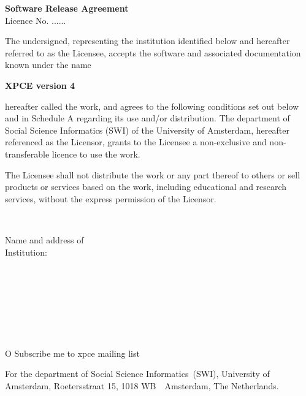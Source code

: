 \setlength{\parindent}{0in}
\setlength{\parskip}{5pt}
\nofiles

\begin{center}
    { \Large \bf Software Release Agreement } \\
    \vspace{1cm}
    { Licence No. ...... }
    \vspace{1.5cm}
\end{center}

The undersigned, representing the institution identified below and
hereafter referred to as the Licensee, accepts the software and
associated documentation known under the name

\vspace{5mm}
\centerline{\Large \bf XPCE version 4}
\vspace{5mm}

hereafter called the work, and agrees to the following conditions set
out below and in Schedule A regarding its use and/or distribution. The
department of Social Science Informatics (SWI) of the University of
Amsterdam, hereafter referenced as the Licensor, grants to the Licensee
a non-exclusive and non-transferable licence to use the work.

The Licensee shall not distribute the work or any part thereof to others
or sell products or services based on the work, including educational
and research services, without the express permission of the Licensor.

\newlength{\tag}
\settowidth{\tag}{Authorised Signature: }
\newlength{\rest}
\setlength{\rest}{\textwidth}
\addtolength{\rest}{-\tag}

\newcommand{\fillin}{\dotfill\mbox{}}
\newcommand{\onlydots}{\mbox{}\fillin}
\newcommand{\next}{\\[5mm]}

\vspace{0.5cm}
\fillin \next
\parbox[t]{\tag}{Name and address of \\ Institution:}%
\parbox[t]{\rest}{\onlydots \next \onlydots \next \onlydots} \next
{}\fillin \next
{}\fillin \next
{}\fillin \next
{}\fillin O Subscribe me to xpce mailing
list\next \vspace{0.3cm}

For the department of Social Science Informatics~(SWI), University of
Amsterdam, Roetersstraat 15, 1018 WB~~Amsterdam, The Netherlands. 
\vspace{1cm}

